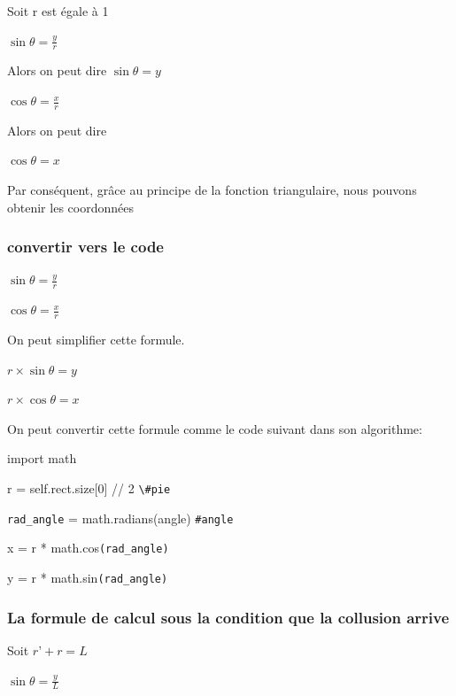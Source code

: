 \documentclass{article}
\begin{document}
\vspace{1cm}
Soit r est égale à 1\newline

$\sin\theta = \frac{y}{r}$


Alors on peut dire $\sin\theta = y$


$\cos\theta = \frac{x}{r}$


Alors on peut dire 

$\cos\theta = x$


Par conséquent, grâce au principe de la fonction triangulaire, nous pouvons obtenir les coordonnées
\subsubsection{convertir vers le code}
$\sin\theta = \frac{y}{r}$


$\cos\theta = \frac{x}{r}$


On peut simplifier cette formule.


$r\times\sin\theta = y$


$r\times\cos\theta = x$

On peut convertir cette formule comme le code suivant dans son algorithme:


import math
 
 
r = self.rect.size[0] // 2 \verb|\#pie|
  

\verb|rad_angle| = math.radians(angle) \verb|#angle|


x = r * math.cos\verb|(rad_angle)|


y = r * math.sin\verb|(rad_angle)|
\subsubsection{La formule de calcul sous la condition que la collusion arrive}
\vspace{1cm}


Soit $r’+r = L$


$\sin\theta = \frac{y}{L}$
\end{document}
